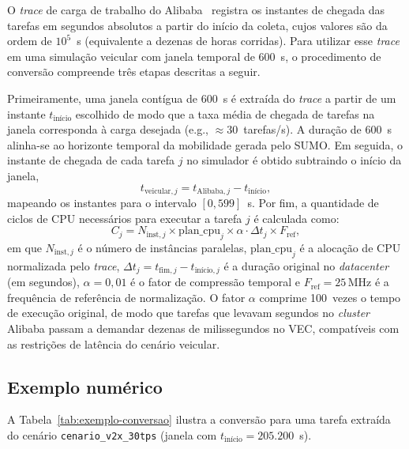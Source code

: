 \label{ap:conversao-alibaba}

O \textit{trace} de carga de trabalho do Alibaba~\cite{cheng2018characterizing} registra os instantes de chegada das tarefas em segundos absolutos a partir do início da coleta, cujos valores são da ordem de $10^5$~s (equivalente a dezenas de horas corridas). Para utilizar esse \textit{trace} em uma simulação veicular com janela temporal de 600~s, o procedimento de conversão compreende três etapas descritas a seguir.

Primeiramente, uma janela contígua de 600~s é extraída do \textit{trace} a partir de um instante $t_{\text{início}}$ escolhido de modo que a taxa média de chegada de tarefas na janela corresponda à carga desejada (e.g., $\approx 30$~tarefas/s). A duração de 600~s alinha-se ao horizonte temporal da mobilidade gerada pelo \acrshort{SUMO}. Em seguida, o instante de chegada de cada tarefa $j$ no simulador é obtido subtraindo o início da janela,
\begin{equation}
    t_{\text{veicular},j} = t_{\text{Alibaba},j} - t_{\text{início}},
    \label{eq:t-veicular}
\end{equation}
mapeando os instantes para o intervalo $[0, 599]$~s. Por fim, a quantidade de ciclos de \gls{CPU} necessários para executar a tarefa $j$ é calculada como:
\begin{equation}
    C_j = N_{\text{inst},j} \times \text{plan\_cpu}_j \times \alpha \cdot \Delta t_j \times F_{\text{ref}},
    \label{eq:ciclos}
\end{equation}
em que $N_{\text{inst},j}$ é o número de instâncias paralelas, $\text{plan\_cpu}_j$ é a alocação de \gls{CPU} normalizada pelo \textit{trace}, $\Delta t_j = t_{\text{fim},j} - t_{\text{início},j}$ é a duração original no \textit{datacenter} (em segundos), $\alpha = 0{,}01$ é o fator de compressão temporal e $F_{\text{ref}} = 25\,\text{MHz}$ é a frequência de referência de normalização. O fator $\alpha$ comprime 100~vezes o tempo de execução original, de modo que tarefas que levavam segundos no \textit{cluster} Alibaba passam a demandar dezenas de milissegundos no \gls{VEC}, compatíveis com as restrições de latência do cenário veicular.

\subsection*{Exemplo numérico}

A Tabela~\ref{tab:exemplo-conversao} ilustra a conversão para uma tarefa extraída do cenário \texttt{cenario\_v2x\_30tps} (janela com $t_{\text{início}} = 205.200$~s).

